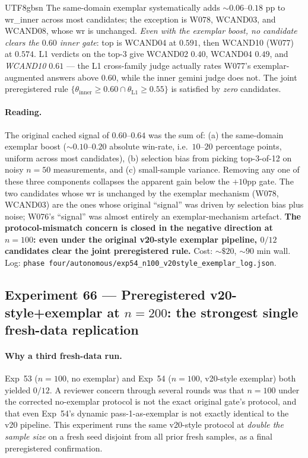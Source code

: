\documentclass{article}
\begin{document}
\begin{CJK*}{UTF8}{gbsn}
\noindent The same-domain exemplar systematically adds
\(\sim 0.06\)--\(0.18\) pp to wr\_inner across most candidates;
the exception is W078, WCAND03, and WCAND08, whose wr is
unchanged. \emph{Even with the exemplar boost, no candidate clears
the \(0.60\) inner gate}: top is WCAND04 at \(0.591\), then
WCAND10 (W077) at \(0.574\). L1 verdicts on the top-3 give
WCAND02 \(0.40\), WCAND04 \(0.49\), and \emph{WCAND10
\(\mathbf{0.61}\)} --- the L1 cross-family judge actually rates
W077's exemplar-augmented answers above \(0.60\), while the
inner gemini judge does not. The joint preregistered rule
\(\{\theta_{\text{inner}} \geq 0.60 \cap \theta_{\text{L1}} \geq
0.55\}\) is satisfied by \emph{zero} candidates.

\paragraph{Reading.} The original cached signal of \(0.60\)--\(0.64\)
was the sum of: (a) the same-domain exemplar boost
(\({\sim}0.10\)--\(0.20\) absolute win-rate, i.e.\
\(10\)--\(20\) percentage points, uniform across most candidates),
(b) selection bias from picking top-3-of-12 on noisy \(n=50\)
measurements, and (c) small-sample variance. Removing any one of
these three components collapses the apparent gain below the
\(+10\)pp gate. The two candidates whose wr is unchanged by the
exemplar mechanism (W078, WCAND03) are the ones whose original
``signal'' was driven by selection bias plus noise; W076's
``signal'' was almost entirely an exemplar-mechanism artefact.
\textbf{The protocol-mismatch concern is closed in the negative
direction at \(n=100\): even under the original v20-style exemplar
pipeline, \(0/12\) candidates clear the joint preregistered rule.}
Cost: \(\sim\$20\), \(\sim 90\) min wall. Log:
\texttt{phase four/autonomous/exp54\_n100\_v20style\_exemplar\_log.json}.

\subsection{Experiment 66 --- Preregistered v20-style+exemplar at
\(n=200\): the strongest single fresh-data replication}
\label{sec:exp66}

\paragraph{Why a third fresh-data run.} Exp~53 (\(n=100\), no
exemplar) and Exp~54 (\(n=100\), v20-style exemplar) both yielded
\(0/12\). A reviewer concern through several rounds was that
\(n=100\) under the corrected no-exemplar protocol is not the
exact original gate's protocol, and that even Exp~54's dynamic
pass-1-as-exemplar is not exactly identical to the v20 pipeline.
This experiment runs the same v20-style protocol at \emph{double
the sample size} on a fresh seed disjoint from all prior fresh
samples, as a final preregistered confirmation.


\end{CJK*}
\end{document}
